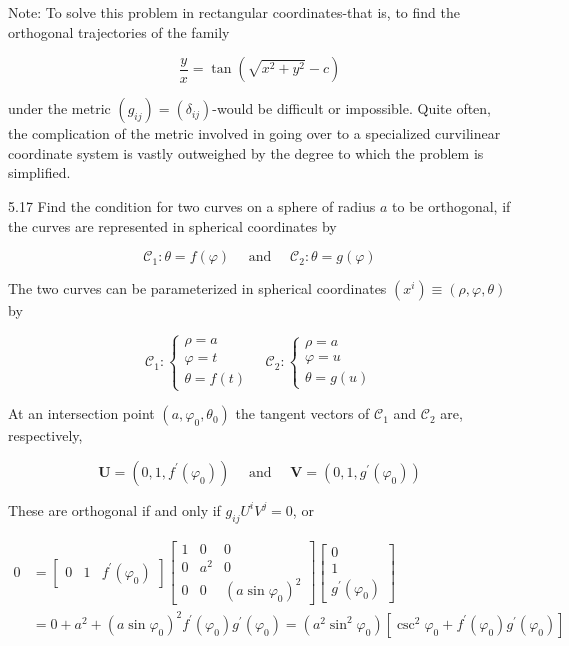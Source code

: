 \documentclass[10pt]{article}
\begin{document}
Note: To solve this problem in rectangular coordinates-that is, to find the orthogonal trajectories of the family

$$
\frac{y}{x}=\tan \left(\sqrt{x^{2}+y^{2}}-c\right)
$$

under the metric $\left(g_{i j}\right)=\left(\delta_{i j}\right)$-would be difficult or impossible. Quite often, the complication of the metric involved in going over to a specialized curvilinear coordinate system is vastly outweighed by the degree to which the problem is simplified.

5.17 Find the condition for two curves on a sphere of radius $a$ to be orthogonal, if the curves are represented in spherical coordinates by

$$
\mathscr{C}_{1}: \theta=f(\varphi) \quad \text { and } \quad \mathscr{C}_{2}: \theta=g(\varphi)
$$

The two curves can be parameterized in spherical coordinates $\left(x^{i}\right) \equiv(\rho, \varphi, \theta)$ by

$$
\mathscr{C}_{1}:\left\{\begin{array}{l}
\rho=a \\
\varphi=t \\
\theta=f(t)
\end{array} \quad \mathscr{C}_{2}:\left\{\begin{array}{l}
\rho=a \\
\varphi=u \\
\theta=g(u)
\end{array}\right.\right.
$$

At an intersection point $\left(a, \varphi_{0}, \theta_{0}\right)$ the tangent vectors of $\mathscr{C}_{1}$ and $\mathscr{C}_{2}$ are, respectively,

$$
\mathbf{U}=\left(0,1, f^{\prime}\left(\varphi_{0}\right)\right) \quad \text { and } \quad \mathbf{V}=\left(0,1, g^{\prime}\left(\varphi_{0}\right)\right)
$$

These are orthogonal if and only if $g_{i j} U^{i} V^{j}=0$, or

$$
\begin{aligned}
0 & =\left[\begin{array}{lll}
0 & 1 & f^{\prime}\left(\varphi_{0}\right)
\end{array}\right]\left[\begin{array}{ccc}
1 & 0 & 0 \\
0 & a^{2} & 0 \\
0 & 0 & \left(a \sin \varphi_{0}\right)^{2}
\end{array}\right]\left[\begin{array}{c}
0 \\
1 \\
g^{\prime}\left(\varphi_{0}\right)
\end{array}\right] \\
& =0+a^{2}+\left(a \sin \varphi_{0}\right)^{2} f^{\prime}\left(\varphi_{0}\right) g^{\prime}\left(\varphi_{0}\right)=\left(a^{2} \sin ^{2} \varphi_{0}\right)\left[\csc ^{2} \varphi_{0}+f^{\prime}\left(\varphi_{0}\right) g^{\prime}\left(\varphi_{0}\right)\right]
\end{aligned}
$$
\end{document}
